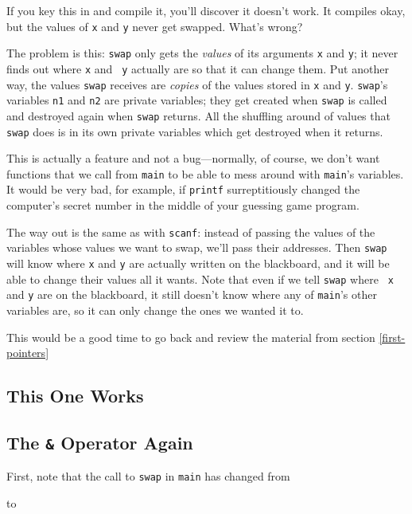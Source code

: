 If you key this in and compile it, you'll discover it doesn't work.  It
compiles okay, but the values of {\tt x} and {\tt y} never get swapped.
What's wrong?

The problem is this: {\tt swap} only gets the {\em values}\/ of its
arguments {\tt x} and {\tt y}; it never finds out where {\tt x} and {\tt
y} actually are so that it can change them.  Put another way, the values
{\tt swap} receives are {\em copies}\/ of the values stored in {\tt x}
and {\tt y}.  {\tt swap}'s variables {\tt n1} and {\tt n2} are private
variables; they get created when {\tt swap} is called and destroyed
again when {\tt swap} returns.  All the shuffling around of values
that {\tt swap} does is in its own private variables which get
destroyed when it returns.

This is actually a feature and not a bug---normally, of course, we don't
want functions that we call from {\tt main} to be able to mess around
with {\tt main}'s variables.  It would be very bad, for example, if
{\tt printf} surreptitiously changed the computer's secret number in
the middle of your guessing game program.

The way out is the same as with {\tt scanf}:  instead of passing the
values of the variables whose values we want to swap, we'll pass their
addresses.  Then {\tt swap} will know where {\tt x} and {\tt y} are
actually written on the blackboard, and it will be able to change their
values all it wants.  Note that even if we tell {\tt swap} where {\tt
x} and {\tt y} are on the blackboard, it still doesn't know where any of
{\tt main}'s other variables are, so it can only change the ones we
wanted it to.  

This would be a good time to go back and review the material from
section \ref{first-pointers}

\subsection{This One Works}
\label{swap2}



\subsection{The {\tt\&} Operator Again}

First, note that the call to {\tt swap} in {\tt main} has changed from

\begin{flushleft}
\verb% swap(x, y); %
\end{flushleft}
\noindent to 
\begin{flushleft}
\verb% swap(&x, &y); %
\end{flushleft}

